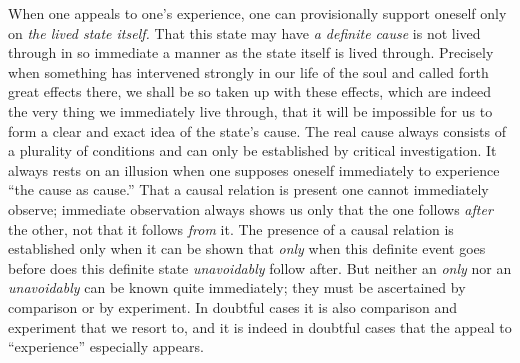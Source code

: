 \documentclass[12pt,a4paper]{book}
\begin{document}
When one appeals to one's experience, one can provisionally support oneself
only on \emph{the lived state itself.} That this state may have \emph{a
definite cause} is not lived through in so immediate a manner as the state
itself is lived through. Precisely when something has intervened strongly in
our life of the soul and called forth great effects there, we shall be so taken
up with these effects, which are indeed the very thing we immediately live
through, that it will be impossible for us to form a clear and exact idea of
the state's cause. The real cause always consists of a plurality of conditions
and can only be established by critical investigation. It always rests on an
illusion when one supposes oneself immediately to experience ``the cause as
cause.'' That a causal relation is present one cannot immediately observe;
immediate observation always shows us only that the one follows \emph{after}
the other, not that it follows \emph{from} it. The presence of a causal
relation is established only when it can be shown that \emph{only} when this
definite event goes before does this definite state \emph{unavoidably} follow
after. But neither an \emph{only} nor an \emph{unavoidably} can be known quite
immediately; they must be ascertained by comparison or by experiment. In
doubtful cases it is also comparison and experiment that we resort to, and it
is indeed in doubtful cases that the appeal to ``experience'' especially
appears.
\end{document}
